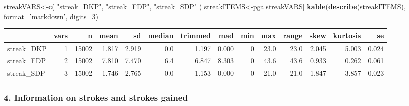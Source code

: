 \documentclass[
]{article}
\newenvironment{Shaded}{\begin{snugshade}}{\end{snugshade}}
\newcommand{\CommentTok}[1]{\textcolor[rgb]{0.56,0.35,0.01}{\textit{#1}}}
\newcommand{\DataTypeTok}[1]{\textcolor[rgb]{0.13,0.29,0.53}{#1}}
\newcommand{\DecValTok}[1]{\textcolor[rgb]{0.00,0.00,0.81}{#1}}
\newcommand{\KeywordTok}[1]{\textcolor[rgb]{0.13,0.29,0.53}{\textbf{#1}}}
\newcommand{\NormalTok}[1]{#1}
\newcommand{\OperatorTok}[1]{\textcolor[rgb]{0.81,0.36,0.00}{\textbf{#1}}}
\newcommand{\StringTok}[1]{\textcolor[rgb]{0.31,0.60,0.02}{#1}}
\begin{document}
\begin{Shaded}
\begin{Highlighting}[]
\NormalTok{streakVARS<-}\KeywordTok{c}\NormalTok{(}
           \StringTok{"streak_DKP"}\NormalTok{,}
           \StringTok{"streak_FDP"}\NormalTok{,}
           \StringTok{"streak_SDP"}
\NormalTok{)}
\NormalTok{streakITEMS<-pga[streakVARS]}
\KeywordTok{kable}\NormalTok{(}\KeywordTok{describe}\NormalTok{(streakITEMS), }\DataTypeTok{format=}\StringTok{'markdown'}\NormalTok{, }
      \DataTypeTok{digits=}\DecValTok{3}\NormalTok{) }
\end{Highlighting}
\end{Shaded}

\begin{longtable}[]{@{}lrrrrrrrrrrrrr@{}}
\toprule
& vars & n & mean & sd & median & trimmed & mad & min & max & range &
skew & kurtosis & se\tabularnewline
\midrule
\endhead
streak\_DKP & 1 & 15002 & 1.817 & 2.919 & 0.0 & 1.197 & 0.000 & 0 & 23.0
& 23.0 & 2.045 & 5.003 & 0.024\tabularnewline
streak\_FDP & 2 & 15002 & 7.810 & 7.470 & 6.4 & 6.847 & 8.303 & 0 & 43.6
& 43.6 & 0.933 & 0.262 & 0.061\tabularnewline
streak\_SDP & 3 & 15002 & 1.746 & 2.765 & 0.0 & 1.153 & 0.000 & 0 & 21.0
& 21.0 & 1.847 & 3.857 & 0.023\tabularnewline
\bottomrule
\end{longtable}

\hypertarget{information-on-strokes-and-strokes-gained}{%
\subsubsection{4. Information on strokes and strokes
gained}\label{information-on-strokes-and-strokes-gained}}

\begin{Shaded}
\end{Shaded}
\end{document}
